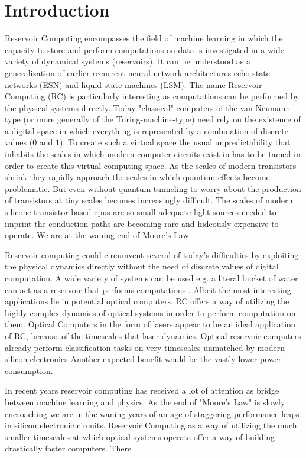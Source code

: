\section{Introduction}

	Reservoir Computing encompasses the field of machine learning in which the capacity to store and perform computations on data is investigated in a wide variety of dynamical systems (reservoirs). It can be understood as a generalization of earlier recurrent neural network architectures echo state networks (ESN) and liquid state machines (LSM). The name Reservoir Computing (RC) is particularly interesting as computations can be performed by the physical systems directly. Today "classical" computers of the van-Neumann-type (or more generally of the Turing-machine-type) need rely on the existence of a digital space in which everything is represented by a combination of discrete values ($0$ and $1$). To create such a virtual space the usual unpredictability that inhabits the scales in which modern computer circuits exist in has to be tamed in order to create this virtual computing space. As the scales of modern transistors shrink they rapidly approach the scales in which quantum effects become problematic. But even without quantum tunneling to worry about the production of transistors at tiny scales becomes increasingly difficult. The scales of modern silicone-transistor based cpus are so small adequate light sources needed to imprint the conduction paths are becoming rare and hideously expensive to operate. We are at the waning end of Moore's Law.
	
	Reservoir computing could circumvent several of today's difficulties by exploiting the physical dynamics directly without the need of discrete values of digital computation. 
	A wide variety of systems can be used e.g. a literal bucket of water can act as a reservoir that performs computations \cite{FER03}. Albeit the most interesting applications lie in potential optical computers. RC offers a way of utilizing the highly complex dynamics of optical systems in order to perform computation on them. Optical Computers in the form of lasers appear to be an ideal application of RC, because of the timescales that laser dynamics.  Optical reservoir computers already perform classification tasks on very timescales unmatched by modern silicon electronics \cite{BRU13a}
	Another expected benefit would be the vastly lower power consumption.  
	

	In recent years reservoir computing has received a lot of attention as bridge between machine learning and physics. As the end of "Moore's Law" is slowly encroaching we are in the waning years of an age of staggering performance leaps in silicon electronic circuits. Reservoir Computing as a way of utilizing the much smaller timescales at which optical systems operate offer a way of building drastically faster computers. There
	
